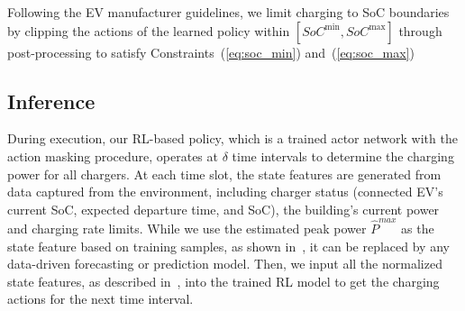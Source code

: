 Following the EV manufacturer guidelines, we limit charging to SoC boundaries by clipping the actions of the learned policy within $[SoC^{\text{min}}, SoC^{\text{max}}]$ through post-processing to satisfy Constraints~(\ref{eq:soc_min}) and~(\ref{eq:soc_max})

\subsection{Inference}
During execution, our RL-based policy, which is a trained actor network with the action masking procedure, operates at $\delta$ time intervals to determine the charging power for all chargers. At each time slot, the state features are generated from data captured from the environment, including charger status (connected EV's current SoC, expected departure time, and SoC), the building's current power and charging rate limits.
While we use the estimated peak power $\hat{P}^{max}$ as the state feature based on training samples, as shown in~, it can be replaced by any data-driven forecasting or prediction model. Then, we input all the normalized state features, as described in~, into the trained RL model to get the charging actions for the next time interval.

